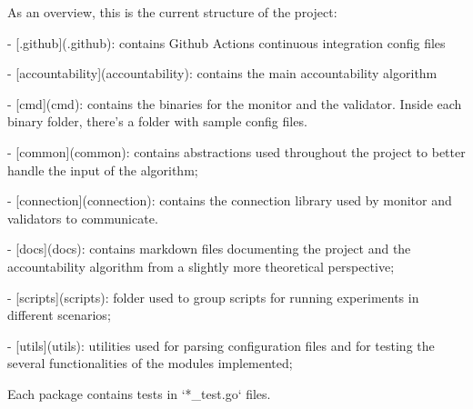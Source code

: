 \documentclass[a4paper,11pt,oneside]{report}
\begin{document}
\begin{markdown}
As an overview, this is the current structure of the project:
    
- [.github](.github): contains Github Actions continuous integration config files

- [accountability](accountability): contains the main accountability algorithm

- [cmd](cmd): contains the binaries for the monitor and the validator. Inside each binary folder, there's a folder with sample config files. 

- [common](common): contains abstractions used throughout the project to better handle the input of the algorithm;

- [connection](connection): contains the connection library used by monitor and validators to communicate.

- [docs](docs): contains markdown files documenting the project and the accountability algorithm from a slightly more theoretical perspective; 

- [scripts](scripts): folder used to group scripts for running experiments in different scenarios; 

- [utils](utils): utilities used for parsing configuration files and for testing the several functionalities of the modules implemented;

Each package contains tests in `*_test.go` files.

\end{markdown}
\end{document}

